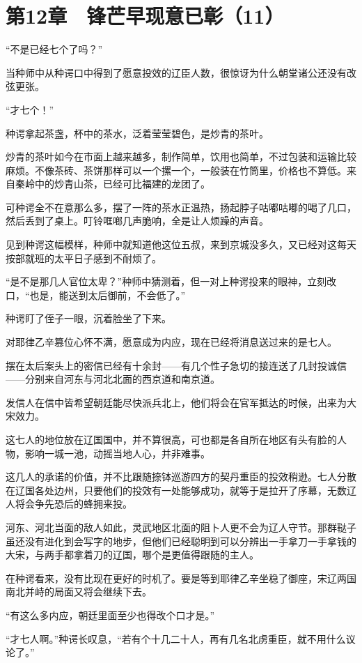 \section{第12章　锋芒早现意已彰（11）}

“不是已经七个了吗？”

当种师中从种谔口中得到了愿意投效的辽臣人数，很惊讶为什么朝堂诸公还没有改弦更张。

“才七个！”

种谔拿起茶盏，杯中的茶水，泛着莹莹碧色，是炒青的茶叶。

炒青的茶叶如今在市面上越来越多，制作简单，饮用也简单，不过包装和运输比较麻烦。不像茶砖、茶饼那样可以一个摞一个，一般装在竹筒里，价格也不算低。来自秦岭中的炒青山茶，已经可比福建的龙团了。

可种谔全不在意那么多，摆了一阵的茶水正温热，扬起脖子咕嘟咕嘟的喝了几口，然后丢到了桌上。叮铃哐啷几声脆响，全是让人烦躁的声音。

见到种谔这幅模样，种师中就知道他这位五叔，来到京城没多久，又已经对这每天按部就班的太平日子感到不耐烦了。

“是不是那几人官位太卑？”种师中猜测着，但一对上种谔投来的眼神，立刻改口，“也是，能送到太后御前，不会低了。”

种谔盯了侄子一眼，沉着脸坐了下来。

对耶律乙辛篡位心怀不满，愿意成为内应，现在已经将消息送过来的是七人。

摆在太后案头上的密信已经有十余封——有几个性子急切的接连送了几封投诚信——分别来自河东与河北北面的西京道和南京道。

发信人在信中皆希望朝廷能尽快派兵北上，他们将会在官军抵达的时候，出来为大宋效力。

这七人的地位放在辽国国中，并不算很高，可也都是各自所在地区有头有脸的人物，影响一城一池，动摇当地人心，并非难事。

这几人的承诺的价值，并不比跟随捺钵巡游四方的契丹重臣的投效稍逊。七人分散在辽国各处边州，只要他们的投效有一处能够成功，就等于是拉开了序幕，无数辽人将会争先恐后的蜂拥来投。

河东、河北当面的敌人如此，灵武地区北面的阻卜人更不会为辽人守节。那群鞑子虽还没有进化到会写字的地步，但他们已经聪明到可以分辨出一手拿刀一手拿钱的大宋，与两手都拿着刀的辽国，哪个是更值得跟随的主人。

在种谔看来，没有比现在更好的时机了。要是等到耶律乙辛坐稳了御座，宋辽两国南北并峙的局面又将会继续下去。

“有这么多内应，朝廷里面至少也得改个口才是。”

“才七人啊。”种谔长叹息，“若有个十几二十人，再有几名北虏重臣，就不用什么议论了。”

